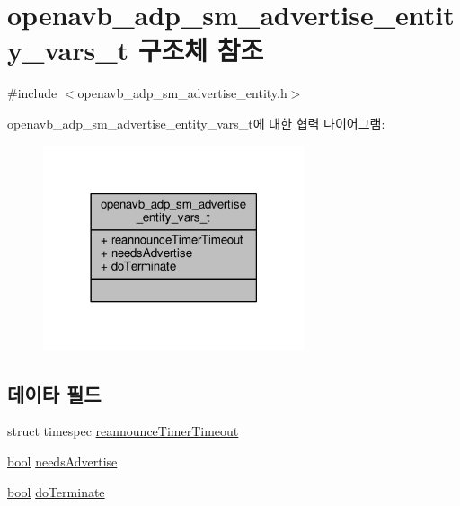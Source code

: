 \hypertarget{structopenavb__adp__sm__advertise__entity__vars__t}{}\section{openavb\+\_\+adp\+\_\+sm\+\_\+advertise\+\_\+entity\+\_\+vars\+\_\+t 구조체 참조}
\label{structopenavb__adp__sm__advertise__entity__vars__t}


{\ttfamily \#include $<$openavb\+\_\+adp\+\_\+sm\+\_\+advertise\+\_\+entity.\+h$>$}



openavb\+\_\+adp\+\_\+sm\+\_\+advertise\+\_\+entity\+\_\+vars\+\_\+t에 대한 협력 다이어그램\+:
\nopagebreak
\begin{figure}[H]
\begin{center}
\leavevmode
\includegraphics[width=218pt]{structopenavb__adp__sm__advertise__entity__vars__t__coll__graph}
\end{center}
\end{figure}
\subsection*{데이타 필드}
\begin{DoxyCompactItemize}
\item 
struct timespec \hyperlink{structopenavb__adp__sm__advertise__entity__vars__t_a5a923bb84c550b6215326f2b61b61317}{reannounce\+Timer\+Timeout}
\item 
\hyperlink{avb__gptp_8h_af6a258d8f3ee5206d682d799316314b1}{bool} \hyperlink{structopenavb__adp__sm__advertise__entity__vars__t_a611772ff7133678dce5edb7324e0be58}{needs\+Advertise}
\item 
\hyperlink{avb__gptp_8h_af6a258d8f3ee5206d682d799316314b1}{bool} \hyperlink{structopenavb__adp__sm__advertise__entity__vars__t_a5fc548cdb095393450f28eab966a626f}{do\+Terminate}
\end{DoxyCompactItemize}


